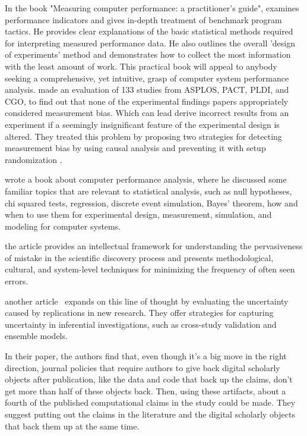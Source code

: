 In the book "Measuring computer performance: a practitioner's guide"\cite{lilja2005measuring},\citeauthor{lilja2005measuring} examines performance indicators and gives in-depth treatment of benchmark program tactics. He provides clear explanations of the basic statistical methods required for interpreting measured performance data. He also outlines the overall 'design of experiments' method and demonstrates how to collect the most information with the least amount of work. This practical book will appeal to anybody seeking a comprehensive, yet intuitive, grasp of computer system performance analysis.
\citeauthor{mytkowicz2009producing} made an evaluation  of 133 studies from ASPLOS, PACT, PLDI, and CGO, to find out that none of the experimental findings papers appropriately considered measurement bias. Which can lead derive incorrect results from an experiment if a seemingly insignificant feature of the experimental design is altered. They treated this problem by proposing two strategies for detecting measurement bias by using causal analysis and preventing it with setup randomization \cite{mytkowicz2009producing}.

\citeauthor{bukh1992art} wrote a book about computer performance analysis, where he discussed some familiar topics that are relevant to statistical analysis, such as null hypotheses, chi squared tests, regression, discrete event simulation, Bayes' theorem, how and when to use them for experimental design, measurement, simulation, and modeling for computer systems.


the article \cite{brown2018issues} provides an intellectual framework for understanding the pervasiveness of mistake in the scientific discovery process and presents methodological, cultural, and system-level techniques for minimizing the frequency of often seen errors.

another article~\cite{patil2018training} expands on this line of thought by evaluating the uncertainty caused by replications in new research. They offer strategies for capturing uncertainty in inferential investigations, such as cross-study validation and ensemble models.

In their paper\cite{stodden2018empirical}, the authors find that, even though it's a big move in the right direction, journal policies that require authors to give back digital scholarly objects after publication, like the data and code that back up the claims, don't get more than half of these objects back. Then, using these artifacts, about a fourth of the published computational claims in the study could be made. They suggest putting out the claims in the literature and the digital scholarly objects that back them up at the same time.

